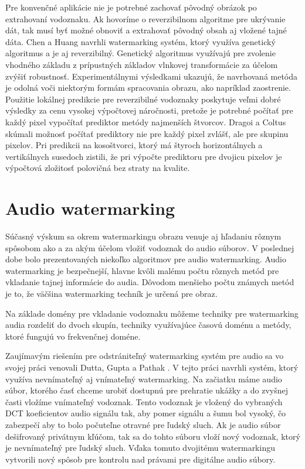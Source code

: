 Pre konvenčné aplikácie nie je potrebné zachovať pôvodný obrázok po extrahovaní vodoznaku. Ak hovoríme o reverzibilnom algoritme pre ukrývanie dát, tak musí byť možné obnoviť a extrahovať pôvodný obsah aj vložené tajné dáta. Chen a Huang \cite{Chen2014} navrhli watermarking systém, ktorý využíva genetický algoritmus a je aj reverzibilný. Genetický algoritmus využívajú pre zvolenie vhodného základu z prípustných základov vlnkovej transformácie za účelom zvýšiť robustnosť.
Experimentálnymi výsledkami ukazujú, že navrhovaná metóda je odolná voči niektorým formám spracovania obrazu, ako napríklad zaostrenie.
Použitie lokálnej predikcie pre reverzibilné vodoznaky poskytuje veľmi dobré výsledky za cenu vysokej výpočtovej náročnosti, pretože je potrebné počítať pre každý pixel vypočítať prediktor metódy najmenších štvorcov. Dragoi a Coltus \cite{Dragoi2015} skúmali možnosť počítať prediktory nie pre každý pixel zvlášť, ale pre skupinu pixelov. Pri predikcii na kosoštvorci, ktorý má štyroch horizontálnych a vertikálnych susedoch zistili, že pri výpočte prediktoru pre dvojicu pixelov je výpočtová zložitosť polovičná bez straty na kvalite.

\section{Audio watermarking}
Súčasný výskum sa okrem watermarkingu obrazu venuje aj hľadaniu rôznym spôsobom ako a za akým účelom vložiť vodoznak do audio súborov.
V poslednej dobe bolo prezentovaných niekoľko algoritmov pre audio watermarking. Audio watermarking je bezpečnejší, hlavne kvôli malému počtu rôznych metód pre vkladanie tajnej informácie do audia. Dôvodom menšieho počtu známych metód je to, že väčšina watermarking techník je určená pre obraz. \cite{Zamani2015}

Na základe domény pre vkladanie vodoznaku môžeme techniky pre watermarking audia rozdeliť do dvoch skupín, techniky využívajúce časovú doménu a metódy, ktoré fungujú vo frekvenčnej doméne. \cite{Fallahpour}

Zaujímavým riešením pre odstrániteľný watermarking systém pre audio sa vo svojej práci venovali Dutta, Gupta a Pathak \cite{Dutta2014}. V tejto práci navrhli systém, ktorý využíva nevnímateľný aj vnímateľný watermarking. Na začiatku máme audio súbor, ktorého časť chceme urobiť dostupnú pre prehratie ukážky a do zvyšnej časti vložíme vnímateľný vodoznak. Tento vodoznak je vložený do vybraných DCT koeficientov audio signálu tak, aby pomer signálu a šumu bol vysoký, čo zabezpečí aby to bolo počuteľne otravné pre ľudský sluch. Ak je audio súbor dešifrovaný privátnym kľúčom, tak sa do tohto súboru vloží nový vodoznak, ktorý je nevnímateľný pre ľudský sluch. Vďaka tomuto dvojitému watermarkingu vytvorili nový spôsob pre kontrolu nad právami pre digitálne audio súbory.

